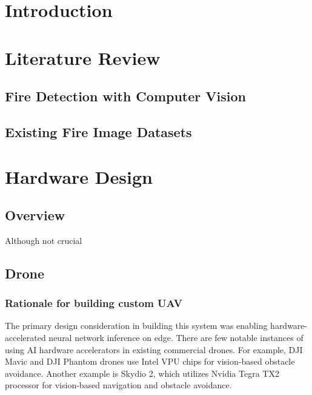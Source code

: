 \section{Introduction}\label{sec:introduction}

\section{Literature Review}\label{sec:literature_review}

  \subsection{Fire Detection with Computer Vision}

  \subsection{Existing Fire Image Datasets}

\section{Hardware Design}\label{sec:hardware}
  
  \subsection{Overview}
  Although not crucial

  \subsection{Drone}

  \subsubsection{Rationale for building custom UAV}

  The primary design consideration in building this system was enabling hardware-accelerated neural network inference on edge.
  There are few notable instances of using AI hardware accelerators in existing commercial drones.
  For example, DJI Mavic and DJI Phantom drones use Intel VPU chips for vision-based obstacle avoidance. 
  Another example is Skydio 2, which utilizes Nvidia Tegra TX2 processor for vision-based navigation and obstacle avoidance.

